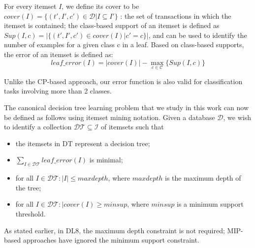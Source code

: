 For every itemset $I$, we define its cover to be $cover (I) = \{(t', I' , c') \in \mathcal{D} | I \subseteq I'\}$ : the set of transactions in which the itemset is contained; the class-based support of an itemset is defined as $Sup(I, c) = |\{(t', I', c')\in cover (I)| c' = c\}|$, and can be used to identify the number of examples for a given class c in a leaf. Based on class-based supports, the error of an itemset is defined as:
\begin{equation}
	leaf\_error(I) =| cover(I) | - \max_{c\in\mathcal{C}}\{Sup(I,c)\}
	\label{eq:1}
\end{equation}

Unlike the CP-based approach, our error function is also valid for classification tasks involving more than 2 classes.

The canonical decision tree learning problem that we
study in this work can now be defined as follows using itemset mining notation. Given a database $\mathcal{D}$, we wish to identify a collection $\mathcal{DT} \subseteq \mathcal{I}$ of itemsets such that
\begin{itemize}
	\item the itemsets in DT represent a decision tree;
	\item $\sum_{I\in\mathcal{DT}} leaf\_error(I)$ is minimal;
	\item for all $I\in\mathcal{DT} : |I| \le maxdepth$, where $maxdepth$ is the maximum depth of the tree;
	\item for all $I\in\mathcal{DT} :| cover(I) \ge minsup$, where $minsup$ is a minimum support threshold.
\end{itemize}
As stated earlier, in DL8, the maximum depth constraint is not required; MIP-based approaches have ignored the minimum support constraint.
